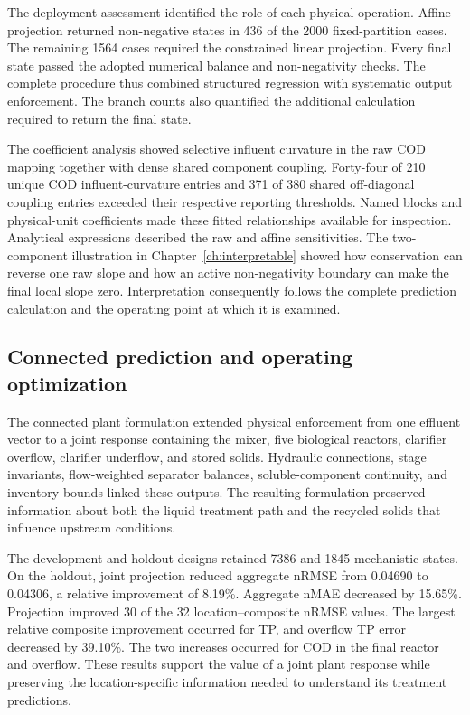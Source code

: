 The deployment assessment identified the role of each physical operation. Affine projection returned non-negative states in 436 of the 2000 fixed-partition cases. The remaining 1564 cases required the constrained linear projection. Every final state passed the adopted numerical balance and non-negativity checks. The complete procedure thus combined structured regression with systematic output enforcement. The branch counts also quantified the additional calculation required to return the final state.

The coefficient analysis showed selective influent curvature in the raw COD mapping together with dense shared component coupling. Forty-four of 210 unique COD influent-curvature entries and 371 of 380 shared off-diagonal coupling entries exceeded their respective reporting thresholds. Named blocks and physical-unit coefficients made these fitted relationships available for inspection. Analytical expressions described the raw and affine sensitivities. The two-component illustration in Chapter~\ref{ch:interpretable} showed how conservation can reverse one raw slope and how an active non-negativity boundary can make the final local slope zero. Interpretation consequently follows the complete prediction calculation and the operating point at which it is examined.

\subsection{Connected prediction and operating optimization}

The connected plant formulation extended physical enforcement from one effluent vector to a joint response containing the mixer, five biological reactors, clarifier overflow, clarifier underflow, and stored solids. Hydraulic connections, stage invariants, flow-weighted separator balances, soluble-component continuity, and inventory bounds linked these outputs. The resulting formulation preserved information about both the liquid treatment path and the recycled solids that influence upstream conditions.

The development and holdout designs retained 7386 and 1845 mechanistic states. On the holdout, joint projection reduced aggregate nRMSE from 0.04690 to 0.04306, a relative improvement of 8.19\%. Aggregate nMAE decreased by 15.65\%. Projection improved 30 of the 32 location--composite nRMSE values. The largest relative composite improvement occurred for TP, and overflow TP error decreased by 39.10\%. The two increases occurred for COD in the final reactor and overflow. These results support the value of a joint plant response while preserving the location-specific information needed to understand its treatment predictions.


